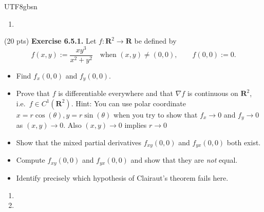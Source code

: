 \documentclass[addpoints]{exam}
\theoremstyle{definition}
\begin{document}
\begin{CJK*}{UTF8}{gbsn}
\begin{questions}
\begin{solution}
\begin{enumerate}
\bigskip
\item[(c)] 

\end{enumerate}

 \end{solution}

\question (20 pts) 
\textbf{Exercise 6.5.1.}
Let $f : \mathbf{R}^2 \to \mathbf{R}$ be defined by
$$
f(x,y)
:=
\frac{xy^3}{x^2+y^2}
\quad \text{when } (x,y)\ne(0,0),
\qquad
f(0,0):=0.
$$
\begin{itemize}
\item[(a)] Find $f_x(0,0)$ and $f_y(0,0)$.
 \item[(b)] Prove that $f$ is differentiable everywhere and that $\nabla f$ is continuous on $\mathbf{R}^2$, i.e.\ $f\in C^1(\mathbf{R}^2)$. Hint: You can use polar coordinate 
$x=r \cos(\theta), y=r \sin (\theta)$ when you try to show that  $f_x \to 0$ and $f_y \to 0$ as
$(x,y)\to 0$. Also $(x,y)\to 0$ implies $r\to 0$
\item[(c)] Show that the mixed partial derivatives $f_{xy}(0,0)$ and $f_{yx}(0,0)$ both exist.
\item[(d)] Compute $f_{xy}(0,0)$ and $f_{yx}(0,0)$ and show that they are \emph{not} equal.
\item[(e)] Identify precisely which hypothesis of Clairaut's theorem fails here.
\end{itemize}


\begin{solution}

\begin{enumerate}
\item[(a)] 



\bigskip
\item[(b)] 




\end{enumerate} 
\end{solution}


\end{questions}
\end{CJK*}
\end{document}
